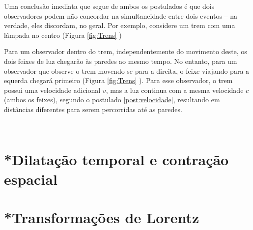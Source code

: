 Uma conclusão imediata que segue de ambos os postulados é que dois observadores podem não concordar na simultaneidade entre dois eventos -- na verdade, eles discordam, no geral. Por exemplo, considere um trem com uma lâmpada no centro (Figura \ref{fig:Trens} )

Para um observador dentro do trem, independentemente do movimento deste, os dois feixes de luz chegarão às paredes ao mesmo tempo. No entanto, para um observador que observe o trem movendo-se para a direita, o feixe viajando para a equerda chegará primeiro (Figura \ref{fig:Trens} ). Para esse observador, o trem possui uma velocidade adicional $v$, mas a luz continua com a mesma velocidade $c$ (ambos os feixes), segundo o postulado \ref{post:velocidade}, resultando em distâncias diferentes para serem percorridas até as paredes.


\begin{figure*}[t]
    \centering
    \begin{subfigure}[t]{0.5\textwidth}
        \centering
        \caption{}
        \label{fig:trem}
    \end{subfigure}%
    ~ 
    \begin{subfigure}[t]{0.5\textwidth}
        \centering
        \caption{}
        \label{fig:TremMovimento}
    \end{subfigure}
    \caption{Feixes de luz partindo do centro de um trem ao mesmo tempo para (a) um observador que anda junto ao trem e (b) para um observador que vê o trem movendo-se com velocidade $v$ para a direita.}
\label{fig:Trens}
\end{figure*}

\section{*Dilatação temporal e contração espacial}


\section{*Transformações de Lorentz}

